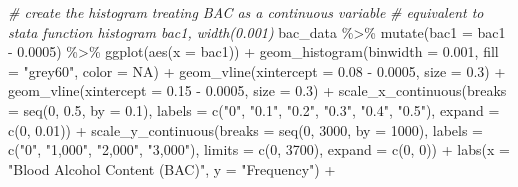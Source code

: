 \documentclass[
  11pt,
]{article}
\newenvironment{Shaded}{\begin{snugshade}}{\end{snugshade}}
\newcommand{\AttributeTok}[1]{\textcolor[rgb]{0.77,0.63,0.00}{#1}}
\newcommand{\CommentTok}[1]{\textcolor[rgb]{0.56,0.35,0.01}{\textit{#1}}}
\newcommand{\ConstantTok}[1]{\textcolor[rgb]{0.00,0.00,0.00}{#1}}
\newcommand{\DecValTok}[1]{\textcolor[rgb]{0.00,0.00,0.81}{#1}}
\newcommand{\FloatTok}[1]{\textcolor[rgb]{0.00,0.00,0.81}{#1}}
\newcommand{\FunctionTok}[1]{\textcolor[rgb]{0.00,0.00,0.00}{#1}}
\newcommand{\NormalTok}[1]{#1}
\newcommand{\SpecialCharTok}[1]{\textcolor[rgb]{0.00,0.00,0.00}{#1}}
\newcommand{\StringTok}[1]{\textcolor[rgb]{0.31,0.60,0.02}{#1}}
\begin{document}
\begin{Shaded}
\begin{Highlighting}[]
\CommentTok{\# create the histogram treating BAC as a continuous variable}
\CommentTok{\# equivalent to stata function histogram bac1, width(0.001)}
\NormalTok{bac\_data }\SpecialCharTok{\%\textgreater{}\%}
  \FunctionTok{mutate}\NormalTok{(}\AttributeTok{bac1 =}\NormalTok{ bac1 }\SpecialCharTok{{-}} \FloatTok{0.0005}\NormalTok{) }\SpecialCharTok{\%\textgreater{}\%}
  \FunctionTok{ggplot}\NormalTok{(}\FunctionTok{aes}\NormalTok{(}\AttributeTok{x =}\NormalTok{ bac1)) }\SpecialCharTok{+}
  \FunctionTok{geom\_histogram}\NormalTok{(}\AttributeTok{binwidth =} \FloatTok{0.001}\NormalTok{, }\AttributeTok{fill =} \StringTok{"grey60"}\NormalTok{, }\AttributeTok{color =} \ConstantTok{NA}\NormalTok{) }\SpecialCharTok{+}
  \FunctionTok{geom\_vline}\NormalTok{(}\AttributeTok{xintercept =} \FloatTok{0.08} \SpecialCharTok{{-}} \FloatTok{0.0005}\NormalTok{, }\AttributeTok{size =} \FloatTok{0.3}\NormalTok{) }\SpecialCharTok{+}
  \FunctionTok{geom\_vline}\NormalTok{(}\AttributeTok{xintercept =} \FloatTok{0.15} \SpecialCharTok{{-}} \FloatTok{0.0005}\NormalTok{, }\AttributeTok{size =} \FloatTok{0.3}\NormalTok{) }\SpecialCharTok{+}
  \FunctionTok{scale\_x\_continuous}\NormalTok{(}\AttributeTok{breaks =} \FunctionTok{seq}\NormalTok{(}\DecValTok{0}\NormalTok{, }\FloatTok{0.5}\NormalTok{, }\AttributeTok{by =} \FloatTok{0.1}\NormalTok{),}
                     \AttributeTok{labels =} \FunctionTok{c}\NormalTok{(}\StringTok{"0"}\NormalTok{, }\StringTok{"0.1"}\NormalTok{, }\StringTok{"0.2"}\NormalTok{, }\StringTok{"0.3"}\NormalTok{, }\StringTok{"0.4"}\NormalTok{, }\StringTok{"0.5"}\NormalTok{),}
                     \AttributeTok{expand =} \FunctionTok{c}\NormalTok{(}\DecValTok{0}\NormalTok{, }\FloatTok{0.01}\NormalTok{)) }\SpecialCharTok{+}
  \FunctionTok{scale\_y\_continuous}\NormalTok{(}\AttributeTok{breaks =} \FunctionTok{seq}\NormalTok{(}\DecValTok{0}\NormalTok{, }\DecValTok{3000}\NormalTok{, }\AttributeTok{by =} \DecValTok{1000}\NormalTok{),}
                     \AttributeTok{labels =} \FunctionTok{c}\NormalTok{(}\StringTok{"0"}\NormalTok{, }\StringTok{"1,000"}\NormalTok{, }\StringTok{"2,000"}\NormalTok{, }\StringTok{"3,000"}\NormalTok{),}
                     \AttributeTok{limits =} \FunctionTok{c}\NormalTok{(}\DecValTok{0}\NormalTok{, }\DecValTok{3700}\NormalTok{),}
                     \AttributeTok{expand =} \FunctionTok{c}\NormalTok{(}\DecValTok{0}\NormalTok{, }\DecValTok{0}\NormalTok{)) }\SpecialCharTok{+}
  \FunctionTok{labs}\NormalTok{(}\AttributeTok{x =} \StringTok{"Blood Alcohol Content (BAC)"}\NormalTok{, }\AttributeTok{y =} \StringTok{"Frequency"}\NormalTok{) }\SpecialCharTok{+}

\end{Highlighting}
\end{Shaded}
\end{document}
